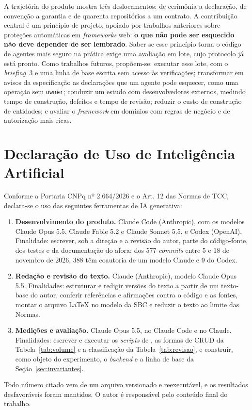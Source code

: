 \documentclass[a4paper,12pt]{article}
\newcommand{\estr}[1]{\textit{#1}}
\begin{document}
A trajetória do produto mostra três deslocamentos: de cerimônia a declaração, de convenção a garantia e de quarenta repositórios a um contrato. A contribuição central é um princípio de projeto, apoiado por trabalhos anteriores sobre proteções automáticas em \estr{frameworks} web: \textbf{o que não pode ser esquecido não deve depender de ser lembrado}. Saber se esse princípio torna o código de agentes mais seguro na prática exige uma avaliação em lote, cujo protocolo já está pronto. Como trabalhos futuros, propõem-se: executar esse lote, com o \estr{briefing}~3 e uma linha de base escrita sem acesso às verificações; transformar em avisos da especificação as declarações que um agente pode esquecer, como uma operação sem \texttt{owner}; conduzir um estudo com desenvolvedores externos, medindo tempo de construção, defeitos e tempo de revisão; reduzir o custo de construção de entidades; e avaliar o \estr{framework} em domínios com regras de negócio e de autorização mais ricas.

\section*{Declaração de Uso de Inteligência Artificial}

Conforme a Portaria CNPq nº 2.664/2026 e o Art. 12 das Normas de TCC, declara-se o uso das seguintes ferramentas de IA generativa:
\begin{enumerate}
  \item \textbf{Desenvolvimento do produto.} Claude Code (Anthropic), com os modelos Claude Opus 5.5, Claude Fable 5.2 e Claude Sonnet 5.5, e Codex (OpenAI). Finalidade: escrever, sob a direção e a revisão do autor, parte do código-fonte, dos testes e da documentação do afora; dos 577 \estr{commits} entre 5 e 18 de novembro de 2026, 388 têm coautoria de um modelo Claude e 9 do Codex.
  \item \textbf{Redação e revisão do texto.} Claude (Anthropic), modelo Claude Opus 5.5. Finalidades: estruturar e redigir versões do texto a partir de um texto-base do autor, conferir referências e afirmações contra o código e as fontes, montar o arquivo \LaTeX{} no modelo da SBC e reduzir o texto ao limite das Normas.
  \item \textbf{Medições e avaliação.} Claude Opus 5.5, no Claude Code e no Claude. Finalidades: escrever e executar os \estr{scripts} de , as formas de CRUD da Tabela~\ref{tab:volume} e a classificação da Tabela~\ref{tab:revisao}, e construir, como objeto do experimento, o \estr{backend} e a linha de base da Seção~\ref{sec:invariantes}.
\end{enumerate}
Todo número citado vem de um arquivo versionado e reexecutável, e os resultados desfavoráveis foram mantidos. O autor é responsável pelo conteúdo final do trabalho.
\end{document}
